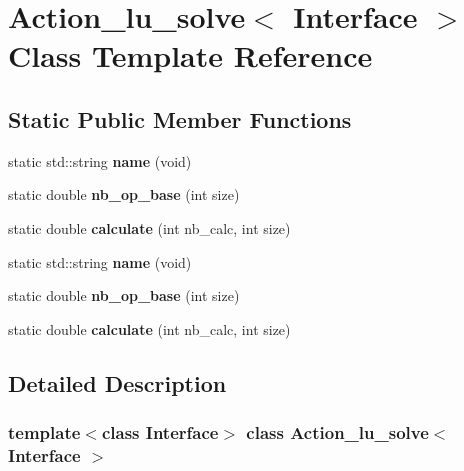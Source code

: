 \hypertarget{class_action__lu__solve}{}\section{Action\+\_\+lu\+\_\+solve$<$ Interface $>$ Class Template Reference}
\label{class_action__lu__solve}
\subsection*{Static Public Member Functions}
\begin{DoxyCompactItemize}
\item 
\mbox{\label{class_action__lu__solve_ad79e7cd88a148650d7fd9fccc4694940}} 
static std\+::string {\bfseries name} (void)
\item 
\mbox{\label{class_action__lu__solve_af579267c5e457ab5b605b24fed01ecd5}} 
static double {\bfseries nb\+\_\+op\+\_\+base} (int size)
\item 
\mbox{\label{class_action__lu__solve_a2b2f7f4438bfc0947d54d0d485069e6c}} 
static double {\bfseries calculate} (int nb\+\_\+calc, int size)
\item 
\mbox{\label{class_action__lu__solve_ad79e7cd88a148650d7fd9fccc4694940}} 
static std\+::string {\bfseries name} (void)
\item 
\mbox{\label{class_action__lu__solve_af579267c5e457ab5b605b24fed01ecd5}} 
static double {\bfseries nb\+\_\+op\+\_\+base} (int size)
\item 
\mbox{\label{class_action__lu__solve_a2b2f7f4438bfc0947d54d0d485069e6c}} 
static double {\bfseries calculate} (int nb\+\_\+calc, int size)
\end{DoxyCompactItemize}


\subsection{Detailed Description}
\subsubsection*{template$<$class Interface$>$\newline
class Action\+\_\+lu\+\_\+solve$<$ Interface $>$}



